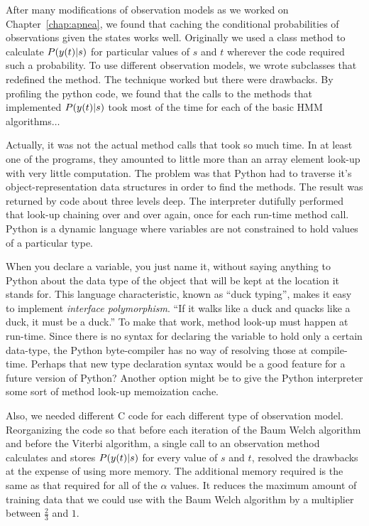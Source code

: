 After many modifications of observation models as we worked on
Chapter~\ref{chap:apnea}, we found that caching the conditional
probabilities of observations given the states works well.  Originally
we used a class method to calculate $P({y}{(t)}|s)$ for particular
values of $s$ and $t$ wherever the code required such a probability.
To use different observation models, we wrote subclasses that
redefined the method.  The technique worked but there were drawbacks.
By profiling the python code, we found that the calls to the methods
that implemented $P({y}{(t)}|s)$ took most of the time for each of
the basic HMM algorithms$\ldots$

Actually, it was not the actual method calls that took so much time.
In at least one of the programs, they amounted to little more than an
array element look-up with very little computation.  The problem was
that Python had to traverse it's object-representation data structures
in order to find the methods.  The result was returned by code about
three levels deep.  The interpreter dutifully performed that look-up
chaining over and over again, once for each run-time method call.
Python is a dynamic language where variables are not constrained to
hold values of a particular type.

When you declare a variable, you just name it, without saying anything
to Python about the data type of the object that will be kept at the
location it stands for.  This language characteristic, known as ``duck
typing'', makes it easy to implement \emph{interface polymorphism}.
``If it walks like a duck and quacks like a duck, it must be a duck.''
To make that work, method look-up must happen at run-time.  Since
there is no syntax for declaring the variable to hold only a certain
data-type, the Python byte-compiler has no way of resolving those at
compile-time.  Perhaps that new type declaration syntax would be a
good feature for a future version of Python?  Another option might be
to give the Python interpreter some sort of method look-up memoization
cache.

Also, we needed different C code for each different type of
observation model.  Reorganizing the code so that before each
iteration of the Baum Welch algorithm and before the Viterbi
algorithm, a single call to an observation method calculates and
stores $P({y}{(t)}|s)$ for every value of $s$ and $t$, resolved the
drawbacks at the expense of using more memory.  The additional memory
required is the same as that required for all of the $\alpha$ values.
It reduces the maximum amount of training data that we could use with
the Baum Welch algorithm by a multiplier between $\frac{2}{3}$ and
$1$.



